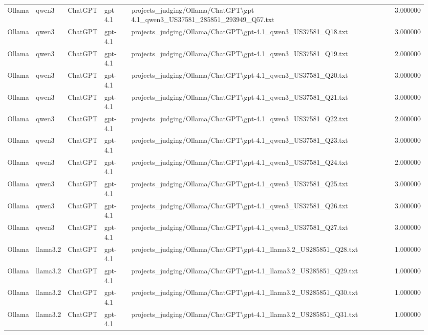 \begin{table}[H]
\begin{tabular}{lllllr}
Ollama & qwen3 & ChatGPT & gpt-4.1 & projects\_judging/Ollama/ChatGPT\textbackslash gpt-4.1\_qwen3\_US37581\_285851\_293949\_Q57.txt & 3.000000 \\
Ollama & qwen3 & ChatGPT & gpt-4.1 & projects\_judging/Ollama/ChatGPT\textbackslash gpt-4.1\_qwen3\_US37581\_Q18.txt & 3.000000 \\
Ollama & qwen3 & ChatGPT & gpt-4.1 & projects\_judging/Ollama/ChatGPT\textbackslash gpt-4.1\_qwen3\_US37581\_Q19.txt & 2.000000 \\
Ollama & qwen3 & ChatGPT & gpt-4.1 & projects\_judging/Ollama/ChatGPT\textbackslash gpt-4.1\_qwen3\_US37581\_Q20.txt & 3.000000 \\
Ollama & qwen3 & ChatGPT & gpt-4.1 & projects\_judging/Ollama/ChatGPT\textbackslash gpt-4.1\_qwen3\_US37581\_Q21.txt & 3.000000 \\
Ollama & qwen3 & ChatGPT & gpt-4.1 & projects\_judging/Ollama/ChatGPT\textbackslash gpt-4.1\_qwen3\_US37581\_Q22.txt & 2.000000 \\
Ollama & qwen3 & ChatGPT & gpt-4.1 & projects\_judging/Ollama/ChatGPT\textbackslash gpt-4.1\_qwen3\_US37581\_Q23.txt & 3.000000 \\
Ollama & qwen3 & ChatGPT & gpt-4.1 & projects\_judging/Ollama/ChatGPT\textbackslash gpt-4.1\_qwen3\_US37581\_Q24.txt & 2.000000 \\
Ollama & qwen3 & ChatGPT & gpt-4.1 & projects\_judging/Ollama/ChatGPT\textbackslash gpt-4.1\_qwen3\_US37581\_Q25.txt & 3.000000 \\
Ollama & qwen3 & ChatGPT & gpt-4.1 & projects\_judging/Ollama/ChatGPT\textbackslash gpt-4.1\_qwen3\_US37581\_Q26.txt & 3.000000 \\
Ollama & qwen3 & ChatGPT & gpt-4.1 & projects\_judging/Ollama/ChatGPT\textbackslash gpt-4.1\_qwen3\_US37581\_Q27.txt & 3.000000 \\
Ollama & llama3.2 & ChatGPT & gpt-4.1 & projects\_judging/Ollama/ChatGPT\textbackslash gpt-4.1\_llama3.2\_US285851\_Q28.txt & 1.000000 \\
Ollama & llama3.2 & ChatGPT & gpt-4.1 & projects\_judging/Ollama/ChatGPT\textbackslash gpt-4.1\_llama3.2\_US285851\_Q29.txt & 1.000000 \\
Ollama & llama3.2 & ChatGPT & gpt-4.1 & projects\_judging/Ollama/ChatGPT\textbackslash gpt-4.1\_llama3.2\_US285851\_Q30.txt & 1.000000 \\
Ollama & llama3.2 & ChatGPT & gpt-4.1 & projects\_judging/Ollama/ChatGPT\textbackslash gpt-4.1\_llama3.2\_US285851\_Q31.txt & 1.000000 \\

\end{tabular}
\end{table}
